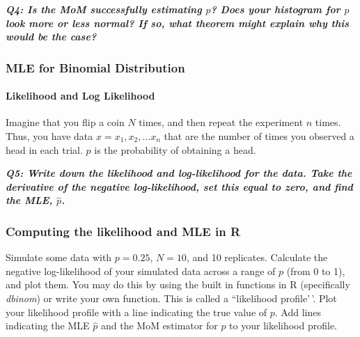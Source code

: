 \documentclass[
]{article}
\begin{document}
\textbf{\emph{Q4: Is the MoM successfully estimating \(p\)? Does your
histogram for \(p\) look more or less normal? If so, what theorem might
explain why this would be the case?}}

\hypertarget{mle-for-binomial-distribution}{%
\subsubsection{MLE for Binomial
Distribution}\label{mle-for-binomial-distribution}}

\hypertarget{likelihood-and-log-likelihood}{%
\paragraph{Likelihood and Log
Likelihood}\label{likelihood-and-log-likelihood}}

Imagine that you flip a coin \(N\) times, and then repeat the experiment
\(n\) times. Thus, you have data \(x=x_1, x_2, \dots x_n\) that are the
number of times you observed a head in each trial. \(p\) is the
probability of obtaining a head.

\textbf{\emph{Q5: Write down the likelihood and log-likelihood for the
data. Take the derivative of the negative log-likelihood, set this equal
to zero, and find the MLE, \(\hat{p}\).}}

\hypertarget{computing-the-likelihood-and-mle-in-r}{%
\subsubsection{Computing the likelihood and MLE in
R}\label{computing-the-likelihood-and-mle-in-r}}

Simulate some data with \(p=0.25\), \(N=10\), and 10 replicates.
Calculate the negative log-likelihood of your simulated data across a
range of \(p\) (from 0 to 1), and plot them. You may do this by using
the built in functions in R (specifically \emph{dbinom}) or write your
own function. This is called a ``likelihood profile'\,'. Plot your
likelihood profile with a line indicating the true value of \(p\). Add
lines indicating the MLE \(\hat{p}\) and the MoM estimator for \(p\) to
your likelihood profile.
\end{document}
